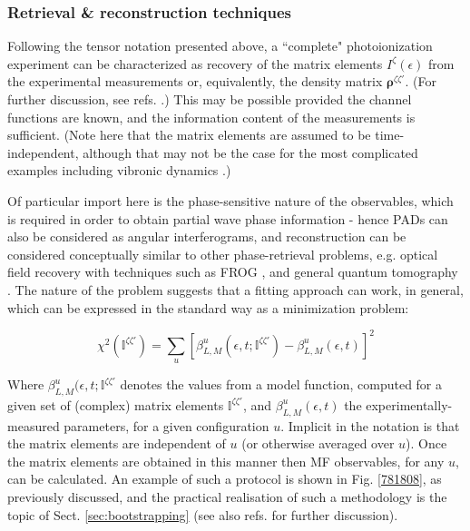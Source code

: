 \subsubsection{Retrieval \& reconstruction techniques}


Following the tensor notation presented above, a ``complete" photoionization experiment can be characterized as recovery of the matrix elements $I^{\zeta}(\epsilon)$ from the experimental measurements or, equivalently, the density matrix $\mathbf{\rho}^{\zeta\zeta'}$. (For further discussion, see refs. \cite{Reid2003,kleinpoppen2013perfect,hockett2018QMP1}.) This may be possible provided the channel functions are known, and the information content of the measurements is sufficient. (Note here that the matrix elements are assumed to be time-independent, although that may not be the case for the most complicated examples including vibronic dynamics \cite{hockett2018QMP2}.) 

Of particular import here is the phase-sensitive nature of the observables, which is required in order to obtain partial wave phase information - hence PADs can also be considered as angular interferograms, and reconstruction can be considered conceptually similar to other phase-retrieval problems, e.g. optical field recovery with techniques such as FROG \cite{trebino2000FrequencyResolvedOpticalGating}, and general quantum tomography \cite{MauroDAriano2003}. The nature of the problem suggests that a fitting approach can work, in general, which can be expressed in the standard way as a minimization problem:

\begin{equation}
\chi^{2}(\mathbb{I}^{\zeta\zeta'})=\sum_{u}\left[\beta^{u}_{L,M}(\epsilon,t;\mathbb{I}^{\zeta\zeta'})-\beta^{u}_{L,M}(\epsilon,t)\right]^{2}\label{eq:chi2-I}
\end{equation}

Where $\beta^{u}_{L,M}(\epsilon,t;\mathbb{I}^{\zeta\zeta'}$ denotes  the values from a model function, computed for a given set of (complex) matrix elements $\mathbb{I}^{\zeta\zeta'}$, and $\beta^{u}_{L,M}(\epsilon,t)$ the experimentally-measured parameters, for a given configuration $u$. Implicit in the notation is that the matrix elements are independent of $u$ (or otherwise averaged over $u$). Once the matrix elements are obtained in this manner then MF observables, for any $u$, can be calculated. An example of such a protocol is shown in Fig. \ref{781808}, as previously discussed, and the practical realisation of such a methodology is the topic of Sect. \ref{sec:bootstrapping} (see also refs. \cite{hockett2018QMP2,marceau2017MolecularFrameReconstruction} for further discussion).

